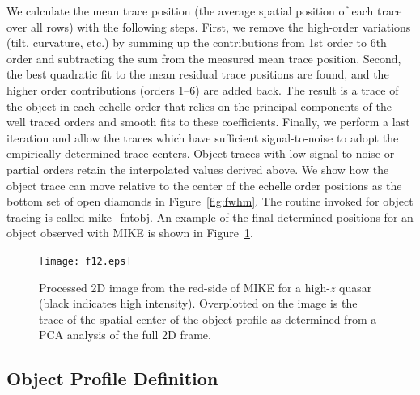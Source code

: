 \documentclass[]{emulateapj}
\begin{document}
We calculate the mean trace position (the average spatial position
of each trace over all rows) with the following steps.  First, we remove the
high-order variations (tilt, curvature, etc.) by summing up the contributions
from 1st order to 6th order and subtracting the sum from the measured mean
trace position.  Second, the best quadratic fit to the mean residual trace 
positions are found, and the higher order contributions (orders 1--6) are
added back.  The result is a trace of the object in each echelle order
that relies on the principal components of the well traced orders and
smooth fits to these coefficients.  Finally, we perform a last iteration and
allow the traces which have sufficient signal-to-noise to adopt the 
empirically determined trace centers.  Object traces with low 
signal-to-noise or partial orders retain the interpolated values derived above.
We show how the object trace can
move relative to the center of the echelle order positions 
as the bottom set of open diamonds in Figure~\ref{fig:fwhm}.
The routine invoked for object tracing is called mike\_fntobj.
An example of the final determined positions for an object observed with
MIKE is shown in Figure~\ref{fig:trcobj}.  


\begin{figure}
\texttt{[image: f12.eps]}
\caption{Processed 2D image from the red-side of MIKE for a high-$z$ quasar
(black indicates high intensity).  Overplotted on the image is the trace
of the spatial center of the object profile as determined from a PCA
analysis of the full 2D frame.
}
\label{fig:trcobj}
\end{figure}

\subsection{Object Profile Definition}
\end{document}
